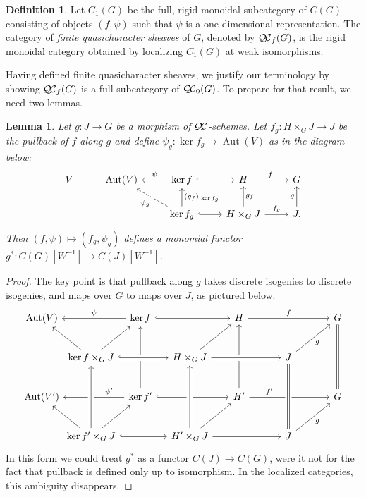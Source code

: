 \documentclass{amsart}
\theoremstyle{plain}
\newtheorem{lemma}[theorem]{Lemma}
\theoremstyle{definition}
\newtheorem{definition}[theorem]{Definition}
\theoremstyle{remark}
\DeclareMathOperator{\Aut}{Aut}
\newcommand{\QC}{{\mathcal{Q\hskip-0.8pt C}}}
\newcommand{\QCb}{{\QC_0}}
\newcommand{\QCf}{{\QC_f}}
\begin{document}
\begin{definition}
Let $C_1(G)$ be the full, rigid monoidal subcategory of $C(G)$ consisting of objects
$(f,\psi)$ such that $\psi$ is a one-dimensional representation.
The category of \emph{finite quasicharacter sheaves} of $G$, denoted by $\QCf(G)$,
is the rigid monoidal category obtained by localizing $C_1(G)$ at weak isomorphisms.
\end{definition}

Having defined finite quasicharacter sheaves,
we justify our terminology by showing $\QCf(G)$ is a full subcategory of $\QCb(G)$.
To prepare for that result, we need two lemmas.

\begin{lemma}\label{lemma:finite-pullback}
Let $g : J \to G$ be a morphism of $\QC$-schemes.
Let $f_g : H\times_G J\to J$
be the pullback of $f$ along $g$ and define $\psi_g : \ker f_g \to \Aut(V)$ as in the diagram below:
\[
\begin{tikzcd}
V & \Aut(V) & \arrow[swap]{l}{\psi} \ker f \arrow[hook]{r} & H \arrow{r}{f} &  G\\
  &  & \arrow[dashed]{ul}{\psi_g} \arrow[swap]{u}{(g_f)\vert_{\ker f_g}} \ker f_g \arrow[hook]{r}
  & \arrow[swap]{u}{g_f} H\times_G J \arrow{r}{f_g} & \arrow{u}{g} J.
\end{tikzcd}
\]
Then $(f,\psi) \mapsto (f_g,\psi_g)$
defines a monomial functor $g^* : C(G)[W^{-1}] \to C(J)[W^{-1}]$.
\end{lemma}

\begin{proof}
The key point is that pullback along $g$ takes discrete isogenies to discrete isogenies,
and maps over $G$ to maps over $J$, as pictured below.
\[
\begin{tikzcd}[row sep={{{{40,between origins}}}},column sep={{{{50,between origins}}}}]
\Aut(V) && \arrow[swap]{ll}{\psi} \ker f \arrow[hook]{rr} \arrow[leftarrow]{dd} && H \arrow{rr}{f} \arrow[leftarrow]{dd} && \arrow[equal]{dd} G\\
& \arrow{ul} \ker f\times_G J \arrow{ur} \arrow[hook, crossing over]{rr} && H\times_G J \arrow{ur} \arrow[crossing over]{rr} && J \arrow[swap]{ur}{g} & \\
 \Aut(V') && \arrow[swap,pos=0.25]{ll}{\psi'} \ker f'  \arrow[hook]{rr}
&& H' \arrow[pos=0.25]{rr}{f'} && G\\
 & \arrow{ul} \ker f'\times_G J \arrow[crossing over]{uu} \arrow{ur} \arrow[hook]{rr}
 && \arrow[crossing over]{uu} H'\times_G J \arrow{ur} \arrow{rr} && \arrow[equals, crossing over]{uu} J \arrow[swap]{ur}{g} &
\end{tikzcd}
\]
In this form we could treat $g^*$ as a functor $C(J)\to C(G)$,
were it not for the fact that pullback is defined only up to isomorphism.
In the localized categories, this ambiguity disappears.
\end{proof}
\end{document}
